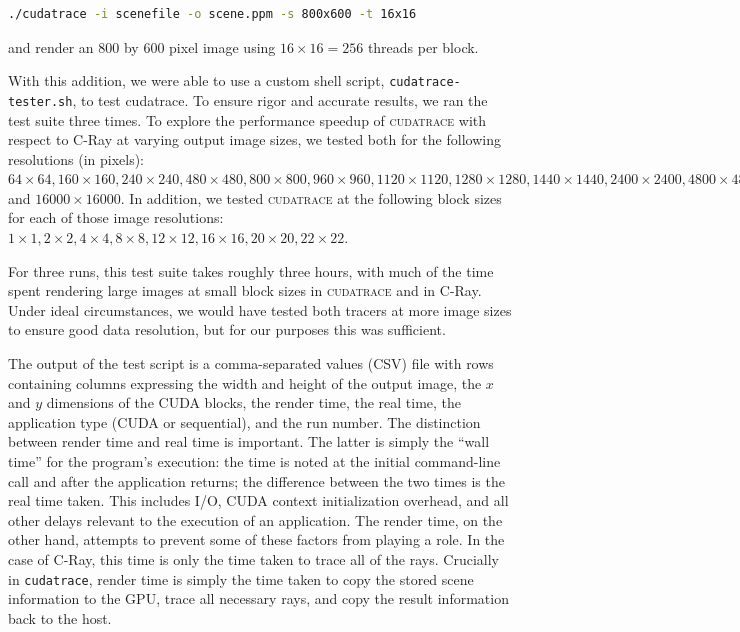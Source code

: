\documentclass[12pt]{article}
\begin{document}
\begin{lstlisting}[language=bash]
    ./cudatrace -i scenefile -o scene.ppm -s 800x600 -t 16x16
\end{lstlisting}

and render an 800 by 600 pixel image using $16 \times 16 = 256$ threads per block.

With this addition, we were able to use a custom shell script, \texttt{cudatrace-tester.sh}, to test cudatrace. To ensure rigor and accurate results, we ran the test suite three times. To explore the performance speedup of \textsc{cudatrace} with respect to C-Ray at varying output image sizes, we tested both for the following resolutions (in pixels): $64 \times 64, 160\times160, 240\times240, 480\times480, 800\times800, 960\times960, 1120\times1120, 1280\times1280, 1440\times1440, 2400\times2400, 4800\times4800, 8000\times8000, 9600\times9600, 11200\times11200, 12800\times12800, 14400\times14400,$ and $16000\times16000$. In addition, we tested \textsc{cudatrace} at the following block sizes for each of those image resolutions: $1\times1, 2\times2, 4\times4, 8\times8, 12\times12, 16\times16, 20\times20, 22\times22$.

For three runs, this test suite takes roughly three hours, with much of the time spent rendering large images at small block sizes in \textsc{cudatrace} and in C-Ray. Under ideal circumstances, we would have tested both tracers at more image sizes to ensure good data resolution, but for our purposes this was sufficient.

The output of the test script is a comma-separated values (CSV) file with rows containing columns expressing the width and height of the output image, the $x$ and $y$ dimensions of the CUDA blocks, the render time, the real time, the application type (CUDA or sequential), and the run number. The distinction between render time and real time is important. The latter is simply the ``wall time'' for the program's execution: the time is noted at the initial command-line call and after the application returns; the difference between the two times is the real time taken. This includes I/O, CUDA context initialization overhead, and all other delays relevant to the execution of an application. The render time, on the other hand, attempts to prevent some of these factors from playing a role.  In the case of C-Ray, this time is only the time taken to trace all of the rays. Crucially in \texttt{cudatrace}, render time is simply the time taken to copy the stored scene information to the GPU, trace all necessary rays, and copy the result information back to the host.
\end{document}
